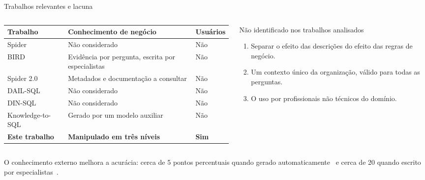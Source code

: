 \documentclass[aspectratio=169,10pt]{beamer}
\newcommand{\cab}[1]{\textcolor{UnBAzul}{\textbf{#1}}}
\begin{document}
\begin{frame}{Trabalhos relevantes e lacuna}
  \begin{columns}[T,onlytextwidth]
    \begin{column}{0.57\textwidth}
      \footnotesize
      \begin{tabular}{@{}L{24mm}L{37mm}l@{}}
        \toprule
        \cab{Trabalho} & \cab{Conhecimento de negócio} &
        \cab{Usuários}\\
        \midrule
        Spider~\cite{yu2018} & Não considerado & Não\\
        BIRD~\cite{li2023} & Evidência por pergunta, escrita por especialistas & Não\\
        Spider 2.0~\cite{lei2025} & Metadados e documentação a consultar & Não\\
        DAIL-SQL~\cite{gao2024} & Não considerado & Não\\
        DIN-SQL~\cite{pourreza2023} & Não considerado & Não\\
        Knowledge-to-SQL~\cite{hong2024} & Gerado por um modelo auxiliar & Não\\
        \midrule
        \textbf{Este trabalho} & \textbf{Manipulado em três níveis} & \textbf{Sim}\\
        \bottomrule
      \end{tabular}
    \end{column}
    \begin{column}{0.4\textwidth}
      \begin{block}{Não identificado nos trabalhos analisados}
        \small
        \begin{enumerate}
          \item Separar o efeito das descrições do efeito das regras de negócio.
          \item Um contexto único da organização, válido para todas as perguntas.
          \item O uso por profissionais não técnicos do domínio.
        \end{enumerate}
      \end{block}
    \end{column}
  \end{columns}
  \vspace{2mm}
  {\small O conhecimento externo melhora a acurácia: cerca de 5 pontos percentuais quando gerado
  automaticamente~\cite{hong2024} e cerca de 20 quando escrito por especialistas~\cite{li2023}.}
\end{frame}
\end{document}
